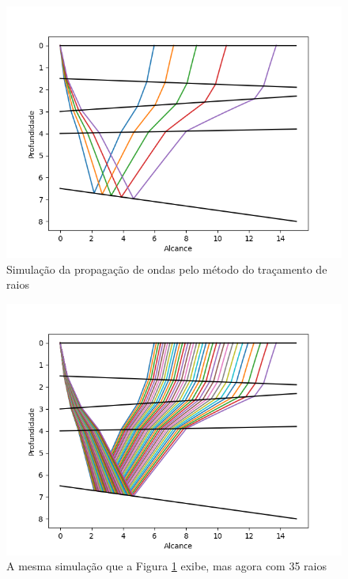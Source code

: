             \begin{figure}[H]
            	\centering
            	\label{RTsim01}
            	\includegraphics[scale=.6]{imagens/RTimages/sim01.png}
            	\caption{Simulação da propagação de ondas pelo método do traçamento de raios}
            \end{figure}
            
            \begin{figure}[H]
               	\centering
               	\label{RTsim02}
               	\includegraphics[scale=.6]{imagens/RTimages/sim02.png}
               	\caption{A mesma simulação que a Figura \ref{RTsim01} exibe, mas agora com 35 raios}
            \end{figure}
            
